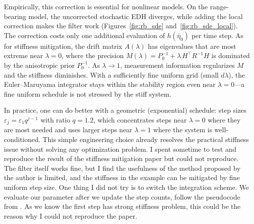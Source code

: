 \documentclass{article}
\begin{document}
Empirically, this correction is essential for nonlinear models. On the range-bearing model, the uncorrected stochastic EDH diverges, while adding the local correction makes the filter work (Figures~\ref{fig:rb_sde} and~\ref{fig:rb_sde_local}). The correction costs only one additional evaluation of $h(\bar\eta_0)$ per time step.
As for stiffness mitigation,  the drift matrix $A(\lambda)$ has eigenvalues that are most extreme near $\lambda = 0$, where the precision $M(\lambda) = P_0^{-1} + \lambda\,H^\top R^{-1} H$ is dominated by the anisotropic prior $P_0^{-1}$. As $\lambda \to 1$, measurement information regularizes $M$ and the stiffness diminishes. With a sufficiently fine uniform grid (small $d\lambda$), the Euler--Maruyama integrator stays within the stability region even near $\lambda = 0$---a fine uniform schedule is not stressed by the stiff system.

In practice, one can do better with a geometric (exponential) schedule: step sizes $\varepsilon_j = \varepsilon_1 q^{j-1}$ with ratio $q = 1.2$, which concentrates steps near $\lambda = 0$ where they are most needed and uses larger steps near $\lambda = 1$ where the system is well-conditioned. This simple engineering choice already resolves the practical stiffness issue without solving any optimization problem. I spent sometime to test and reproduce the result of the stiffness mitigation paper but could not reproduce. The filter itself works fine, but I find the usefulness of the method proposed by the author is limited, and the stiffness in the example can be mitigated by fine uniform step size. One thing I did not try is to switch the integration scheme. We evaluate our parameter after we update the step counts, follow the pseudocode from \cite{ding2012implementation}. As we know the first step has strong stiffness problem, this could be the reason why I could not reproduce the paper. 


\end{document}
